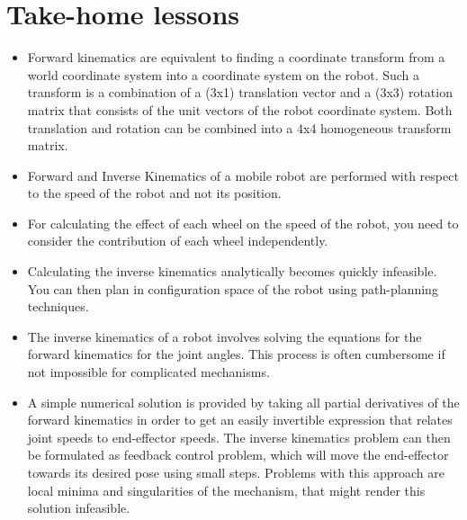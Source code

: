 \section*{Take-home lessons}

\begin{itemize}
\item Forward kinematics are equivalent to finding a coordinate transform from a world coordinate system into a coordinate system on the robot. Such a transform is a combination of a (3x1) translation vector and a (3x3) rotation matrix that consists of the unit vectors of the robot coordinate system. Both translation and rotation can be combined into a 4x4 homogeneous transform matrix.
\item Forward and Inverse Kinematics of a mobile robot are performed with respect to the speed of the robot and not its position.
\item For calculating the effect of each wheel on the speed of the robot, you need to consider the contribution of each wheel independently.
\item Calculating the inverse kinematics analytically becomes quickly infeasible. You can then plan in configuration space of the robot using path-planning techniques.
\item The inverse kinematics of a robot involves solving the equations for the forward kinematics for the joint angles. This process is often cumbersome if not impossible for complicated mechanisms.
\item A simple numerical solution is provided by taking all partial derivatives of the forward kinematics in order to get an easily invertible expression that relates joint speeds to end-effector speeds.
The inverse kinematics problem can then be formulated as feedback control problem, which will move the end-effector towards its desired pose using small steps. Problems with this approach are local minima and singularities of the mechanism, that might render this solution infeasible.
\end{itemize}